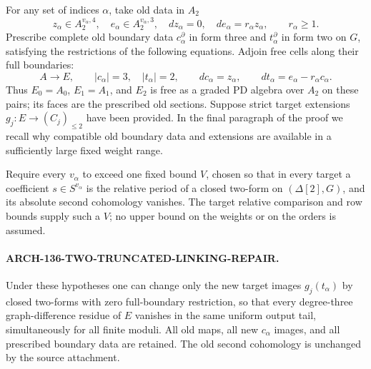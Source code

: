 For any set of indices \(\alpha\), take old data in \(A_2\)
\[
 z_\alpha\in A_2^{v_\alpha,4},\quad
 e_\alpha\in A_2^{v_\alpha,3},\quad
 dz_\alpha=0,\quad de_\alpha=r_\alpha z_\alpha,
                         \qquad r_\alpha\geq1.
                                                               \tag{136.TL2}
\]
Prescribe complete old boundary data \(c_\alpha^\partial\)
in form three and \(t_\alpha^\partial\) in form two on
\(G\), satisfying the restrictions of the following equations.
Adjoin free cells along their full boundaries:
\[
 A\longrightarrow E,
 \qquad |c_\alpha|=3,\quad |t_\alpha|=2,
 \qquad dc_\alpha=z_\alpha,
 \qquad dt_\alpha=e_\alpha-r_\alpha c_\alpha.
                                                               \tag{136.TL3}
\]
Thus \(E_0=A_0\), \(E_1=A_1\), and \(E_2\) is
free as a graded PD algebra over \(A_2\) on these pairs;
its faces are the prescribed old sections.  Suppose strict
target extensions \(g_j:E\to(C_j)_{\leq2}\) have been
provided.  In the final paragraph of the proof we recall why
compatible old boundary data and extensions are available in
a sufficiently large fixed weight range.

Require every \(v_\alpha\) to exceed one fixed bound
\(V\), chosen so that in every target a coefficient
\(s\in S^{v_\alpha}\) is the relative period of a closed
two-form on \((\Delta[2],G)\), and its absolute second
cohomology vanishes.  The target relative comparison and row
bounds supply such a \(V\); no upper bound on the weights
or on the orders is assumed.

\paragraph{ARCH-136-TWO-TRUNCATED-LINKING-REPAIR.}
Under these hypotheses one can change only the new target
images \(g_j(t_\alpha)\) by closed two-forms with zero
full-boundary restriction, so that every degree-three
graph-difference residue of \(E\) vanishes in the same
uniform output tail, simultaneously for all finite moduli.
All old maps, all new \(c_\alpha\) images, and all
prescribed boundary data are retained.  The old second
cohomology is unchanged by the source attachment.

